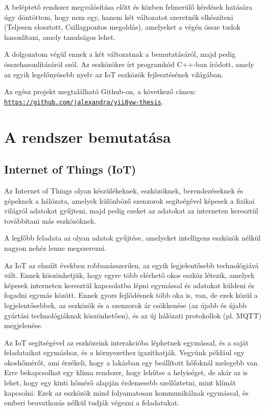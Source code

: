 \documentclass[
]{thesis-ekf}
\theoremstyle{definition}
\theoremstyle{remark}
\begin{document}
A beléptető rendszer megvalósítása előtt és közben felmerülő kérdések hatására úgy döntöttem, hogy nem egy, hanem két változatot szeretnék elkészíteni (Teljesen elosztott, Csillagpontos megoldás), amelyeket a végén össze tudok hasonlítani, amely tanulságos lehet.

A dolgozatom végül ennek a két változatnak a bemutatásáról, majd pedig összehasonlításáról szól. Az eszközökre írt programkód C++-ban íródott, amely az egyik legelőnyösebb nyelv az IoT eszközök fejlesztésének világában.

Az egész projekt megtalálható Github-on, a következő címen: \\\texttt{\url{https://github.com/jalexandra/yii8yw-thesis}}.

\chapter{A rendszer bemutatása}
\section{Internet of Things (IoT)}
Az Internet of Things olyan készülékeknek, eszközöknek, berendezéseknek és gépeknek a hálózata, amelyek különböző szenzorok segítségével képesek a fizikai világról adatokat gyűjteni, majd pedig ezeket az adatokat az interneten keresztül továbbítani más eszközöknek.

A legfőbb feladata az olyan adatok gyűjtése, amelyeket intelligens eszközök nélkül nagyon nehéz lenne megszerezni. 

Az IoT az elmúlt években robbanásszerűen, az egyik legjelentősebb technológiává vált. Ennek köszönhetjük, hogy egyre több elérhető okos eszköz létezik, amelyek képesek interneten keresztül kapcsolatba lépni egymással és adatokat küldeni és fogadni egymás között. Ennek gyors fejlődésnek több oka is, van, de ezek közül a legjelentősebbek, az eszközök és a szenzorok ár csökkenése (az újabb és újabb gyártási technológiáknak köszönhetően), és az új hálózati protokollok (pl. MQTT) megjelenése.

Az IoT segítségével az eszközeink interakcióba léphetnek egymással, és a saját feladataikat egymáshoz, és a környezethez igazíthatják. Vegyünk például egy okoshőmérőt, ami érzékeli, hogy a lakásban egy beállított hőfoknál melegebb van. Erre bekapcsolhat egy klíma rendszer, hogy lehűtse a helyiséget, de akár az is lehet, hogy egy kinti hőmérő alapján érdemesebb szellőztetni, mint klímát kapcsolni. Ezek az eszközök mind folyamatosan kommunikálnak egymással, és emberi beavatkozás nélkül tudják végezni a feladatukat.
\end{document}
